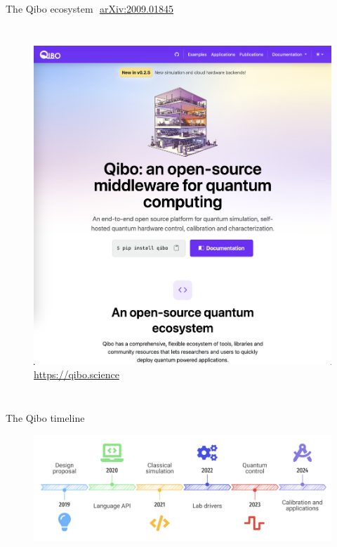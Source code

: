 \documentclass[aspectratio=169, 8pt, xcolor={svgnames}, hyperref={linkcolor=black}]{beamer}
\begin{document}
\begin{frame}{The Qibo ecosystem\hfill \faBook\,\, \href{https://arxiv.org/abs/2009.01845}{arXiv:2009.01845}}
\begin{columns}
     \column{4cm}
     \begin{figure}
       \includegraphics[width=\textwidth]{figures/docs.png}
       {\color{blue}\url{https://qibo.science}}
     \end{figure}
   \end{columns}
\end{frame}

\begin{frame}{The Qibo timeline}
\begin{figure}
   \includegraphics[width=1\linewidth]{figures/timeline.png}
\end{figure}  
\end{frame}
\end{document}
